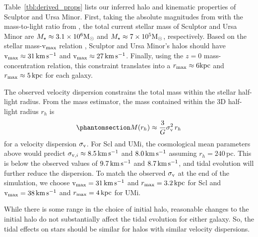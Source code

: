 Table~\ref{tbl:derived_props} lists our inferred halo and kinematic
properties of Sculptor and Ursa Minor. First, taking the absolute
magnitudes from \citet{munoz+2018} with the mass-to-light ratio from
\citet{woo+courteau+dekel2008}, the total current stellar mass of
Sculptor and Ursa Minor are \(M_\star \approx 3.1 \times 10^6 {\rm M}_{\odot}\) and
\(M_\star \approx 7 \times 10^5 {\rm M}_{\odot}\), respectively. Based on the
stellar mass-\({\rm v}_{\rm max}\) relation \citep[from][]{fattahi+2018}, Sculptor
and Ursa Minor's halos should have \({\rm v}_{\rm max} \approx 31 \,{\rm km\,s^{-1}}\) and
\({\rm v}_{\rm max} \approx 27\,{\rm km\,s^{-1}}\). Finally, using the \citet{ludlow+2016}
\(z=0\) mass-concentration relation, this constraint translates into a
\(r_{\rm max} \approx 6 {\rm kpc}\) and \(r_{\rm max} \approx 5\,{\rm kpc}\) for each
galaxy.

The observed velocity dispersion constrains the total mass within the
stellar half-light radius. From the \citet{wolf+2010} mass estimator,
the mass contained within the 3D half-light radius \(r_h\) is
\begin{equation}\protect\phantomsection\label{eq:wolf_mass}{
M(r_h) \approx \frac{3}{G} \sigma_\V^2\,r_h
}\end{equation} for a velocity dispersion \(\sigma_{\rm v}\). For Scl and
UMi, the cosmological mean parameters above would predict
\(\sigma_{{\rm v}, i}  \approx 8.5\,{\rm km\,s^{-1}}\) and \(8.0\,{\rm km\,s^{-1}}\) assuming
\(r_h=240\,\)pc. This is below the observed values of \(9.7\,{\rm km\,s^{-1}}\) and
\(8.7\,{\rm km\,s^{-1}}\), and tidal evolution will further reduce the dispersion.
To match the observed \(\sigma_{\rm v}\) at the end of the simulation, we
choose \({\rm v}_{\rm max} = 31\,{\rm km\,s^{-1}}\) and \(r_{\rm max}=3.2\,{\rm kpc}\) for Scl and
\({\rm v}_{\rm max}=38\,{\rm km\,s^{-1}}\) and \(r_{\rm max}=4\,{\rm kpc}\) for UMi.

While there is some range in the choice of initial halo, reasonable
changes to the initial halo do not substantially affect the tidal
evolution for either galaxy. So, the tidal effects on stars should be
similar for halos with similar velocity dispersions.

